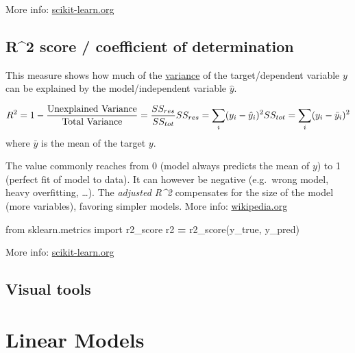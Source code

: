 \documentclass[
]{book}
\newenvironment{Shaded}{\begin{snugshade}}{\end{snugshade}}
\newcommand{\ImportTok}[1]{#1}
\newcommand{\NormalTok}[1]{#1}
\newcommand{\OperatorTok}[1]{\textcolor[rgb]{0.81,0.36,0.00}{\textbf{#1}}}
\begin{document}
More info: \href{https://scikit-learn.org/stable/modules/generated/sklearn.metrics.mean_squared_error.html\#sklearn.metrics.mean_squared_error}{scikit-learn.org}

\hypertarget{r2-score-coefficient-of-determination}{%
\subsection{R\^{}2 score / coefficient of determination}\label{r2-score-coefficient-of-determination}}

This measure shows how much of the \protect\hyperlink{dist_prop}{variance} of the
target/dependent variable \(y\) can be explained by the model/independent
variable \(\hat{y}\).

\[ 
R^2 = 1 - \frac{\text{Unexplained Variance}}{\text{Total Variance}} = \frac{SS_{res}}{SS_{tot}} \\
SS_{res} = \sum_i(y_i-\hat{y}_i)^2 \\
SS_{tot} = \sum_i(y_i - \bar{y}_i)^2
\] where \(\bar{y}\) is the mean of the target \(y\).

The value commonly reaches from 0 (model always predicts the mean of \(y\)) to 1 (perfect fit of model to data). It can however be negative (e.g.~wrong model, heavy overfitting, \ldots). The \emph{adjusted R\^{}2} compensates for the size of the model (more variables), favoring simpler models.
More info: \href{https://en.wikipedia.org/wiki/Coefficient_of_determination}{wikipedia.org}

\begin{Shaded}
\begin{Highlighting}[]
\ImportTok{from}\NormalTok{ sklearn.metrics }\ImportTok{import}\NormalTok{ r2\_score}
\NormalTok{r2 }\OperatorTok{=}\NormalTok{ r2\_score(y\_true, y\_pred)}
\end{Highlighting}
\end{Shaded}

More info: \href{https://scikit-learn.org/stable/modules/generated/sklearn.metrics.r2_score.html\#sklearn.metrics.r2_score}{scikit-learn.org}

\hypertarget{visual-tools}{%
\subsection{Visual tools}\label{visual-tools}}

\hypertarget{linear-models}{%
\section{Linear Models}\label{linear-models}}
\end{document}
